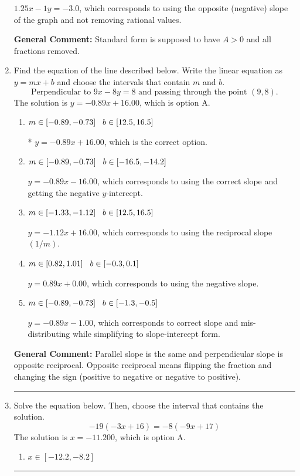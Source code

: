 \documentclass{extbook}[14pt]
\newcommand{\litem}[1]{\item #1

\rule{\textwidth}{0.4pt}}
\begin{document}
\begin{enumerate}
{\begin{enumerate}[label=\Alph*.]
 $1.25x - 1y = -3.0$, which corresponds to using the opposite (negative) slope of the graph and not removing rational values.
\end{enumerate}

\textbf{General Comment:} Standard form is supposed to have $A > 0$ and all fractions removed.
}
\litem{
Find the equation of the line described below. Write the linear equation as $ y=mx+b $ and choose the intervals that contain $m$ and $b$.
\[ \text{Perpendicular to } 9 x - 8 y = 8 \text{ and passing through the point } (9, 8). \]The solution is \( y = -0.89x + 16.00 \), which is option A.\begin{enumerate}[label=\Alph*.]
\item \( m \in [-0.89, -0.73] \hspace*{3mm} b \in [12.5, 16.5] \)

* $y = -0.89x + 16.00$, which is the correct option.
\item \( m \in [-0.89, -0.73] \hspace*{3mm} b \in [-16.5, -14.2] \)

 $y = -0.89x - 16.00$, which corresponds to using the correct slope and getting the negative $y$-intercept.
\item \( m \in [-1.33, -1.12] \hspace*{3mm} b \in [12.5, 16.5] \)

 $y = -1.12x + 16.00$, which corresponds to using the reciprocal slope $(1/m)$.
\item \( m \in [0.82, 1.01] \hspace*{3mm} b \in [-0.3, 0.1] \)

 $y = 0.89x + 0.00$, which corresponds to using the negative slope.
\item \( m \in [-0.89, -0.73] \hspace*{3mm} b \in [-1.3, -0.5] \)

 $y = -0.89x - 1.00$, which corresponds to correct slope and mis-distributing while simplifying to slope-intercept form.
\end{enumerate}

\textbf{General Comment:} Parallel slope is the same and perpendicular slope is opposite reciprocal. Opposite reciprocal means flipping the fraction and changing the sign (positive to negative or negative to positive).
}
\litem{
Solve the equation below. Then, choose the interval that contains the solution.
\[ -19(-3x + 16) = -8(-9x + 17) \]The solution is \( x = -11.200 \), which is option A.\begin{enumerate}[label=\Alph*.]
\item \( x \in [-12.2, -8.2] \)


\end{enumerate}}
\end{enumerate}
\end{document}

